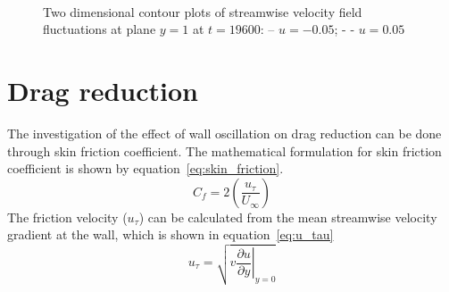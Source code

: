\begin{figure}[!h]
  \centering
   \\
  \caption{Two dimensional contour plots of streamwise velocity field fluctuations at plane $y=1$ at $t= 19600$: -- $u=-0.05$; - - $u=0.05$}
  \label{fig:stream_vel_fluct_250-500}
\end{figure}

\section{Drag reduction}
The investigation of the effect of wall oscillation on drag reduction can be done through skin friction coefficient. The mathematical formulation for skin friction coefficient is shown by equation~\ref{eq:skin_friction}. 
\begin{equation}\label{eq:skin_friction}
  C_f = 2\left(\frac{u_\tau}{U_\infty}\right)
\end{equation}
The friction velocity ($u_\tau$) can be calculated from the mean streamwise velocity gradient at the wall, which is shown in equation~\ref{eq:u_tau}
\begin{equation}\label{eq:u_tau}
  u_\tau = \sqrt{v\left.\frac{\partial u}{\partial y}\right|_{y=0}}
\end{equation} 

